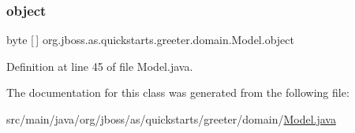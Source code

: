 \subsubsection{\texorpdfstring{object}{object}}
{\footnotesize\ttfamily byte \mbox{[}$\,$\mbox{]} org.\+jboss.\+as.\+quickstarts.\+greeter.\+domain.\+Model.\+object\hspace{0.3cm}{\ttfamily [private]}}



Definition at line 45 of file Model.\+java.



The documentation for this class was generated from the following file\+:\begin{DoxyCompactItemize}
\item 
src/main/java/org/jboss/as/quickstarts/greeter/domain/\hyperlink{_model_8java}{Model.\+java}\end{DoxyCompactItemize}
